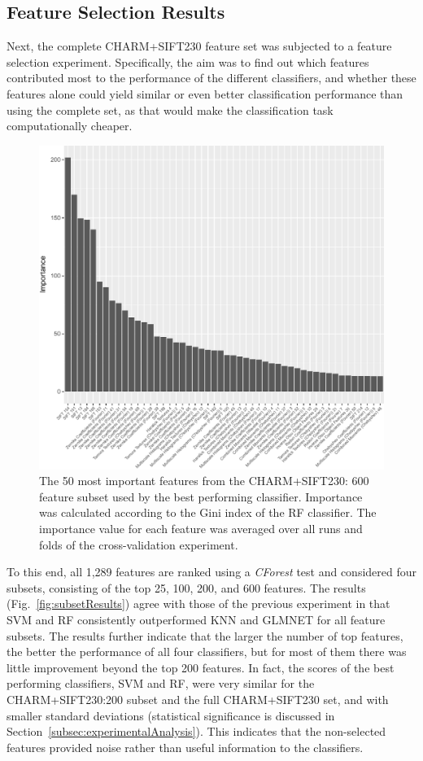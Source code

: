 \subsection{Feature Selection Results}
\label{subsec:featureSelectionResults}
Next, the complete CHARM+SIFT230 feature set was subjected to a feature selection experiment. Specifically, the aim was to find out which features contributed most to the performance of the different classifiers, and whether these features alone could yield similar or even better classification performance than using the complete set, as that would make the classification task computationally cheaper.
\begin{figure}[h!]
	\centering
	\includegraphics[width=\columnwidth]{fig08}
	\caption{The 50 most important features from the CHARM+SIFT230: 600 feature subset used by the best performing classifier. Importance was calculated according to the Gini index of the RF classifier. The importance value for each feature was averaged over all runs and folds of the cross-validation experiment.}
	\label{fig:importanceFeatures}
\end{figure}
To this end, all 1,289 features are ranked using a \textit{CForest} test \cite{strobl2009party} and considered four subsets, consisting of the top 25, 100, 200, and 600 features. The results (Fig.~\ref{fig:subsetResults}) agree with those of the previous experiment in that SVM and RF consistently outperformed KNN and GLMNET for all feature subsets. The results further indicate that the larger the number of top features, the better the performance of all four classifiers, but for most of them there was little improvement beyond the top 200 features. In fact, the scores of the best performing classifiers, SVM and RF, were very similar for the CHARM+SIFT230:200 subset and the full CHARM+SIFT230 set, and with smaller standard deviations (statistical significance is discussed in Section~\ref{subsec:experimentalAnalysis}). This indicates that the non-selected features provided noise rather than useful information to the classifiers.


